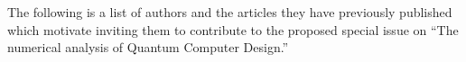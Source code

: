 \documentclass[]{article}
\begin{document}
\begin{comment}

Identifies papers and authors for possible inclusion in the special issue, with a brief description of each paper. (These papers do not need to have been written at this time, although it might be the case that work is already in progress.);

\end{comment}


The following is a list of authors and the articles they
have previously published which motivate inviting them to 
contribute to the proposed special issue on ``The numerical analysis of
Quantum Computer Design.''
\end{document}
